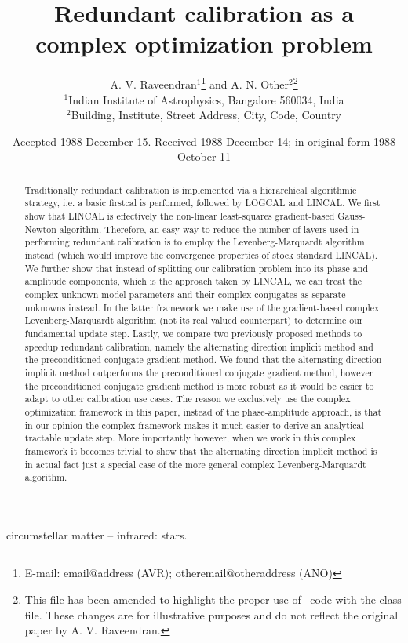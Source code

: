 \documentclass[useAMS,usenatbib]{mn2e}
\title[Unknown]{Redundant calibration as a complex optimization problem}
\author[A. V. Raveendran and A. N. Other]{A. V. Raveendran$^{1}$\thanks{E-mail:
email@address (AVR); otheremail@otheraddress (ANO)} and A. N.
Other$^{2}$\footnotemark[1]\thanks{This file has been amended to
highlight the proper use of \LaTeXe\ code with the class file.
These changes are for illustrative purposes and do not reflect the
original paper by A. V. Raveendran.}\\
$^{1}$Indian Institute of Astrophysics, Bangalore 560034, India\\
$^{2}$Building, Institute, Street Address, City, Code, Country}
\begin{document}
\date{Accepted 1988 December 15. Received 1988 December 14; in original form 1988 October 11}

\pagerange{\pageref{firstpage}--\pageref{lastpage}} 

\maketitle

\label{firstpage}

\begin{abstract}
Traditionally redundant calibration is implemented via a hierarchical algorithmic strategy, i.e. a basic firstcal is performed, followed by LOGCAL and LINCAL.  We first show
that LINCAL is effectively the non-linear least-squares gradient-based Gauss-Newton algorithm. Therefore, an easy way to reduce the number of layers used in performing redundant calibration is to employ the Levenberg-Marquardt algorithm instead (which would improve the convergence properties of stock standard LINCAL). 
We further show that instead of splitting our calibration problem into its phase and amplitude components,
which is the approach taken by LINCAL, we can treat the complex unknown model parameters and their complex conjugates as separate unknowns instead. In the latter framework
we make use of the gradient-based complex Levenberg-Marquardt algorithm (not its real valued counterpart) to determine our fundamental update step. 
Lastly, we compare two previously proposed methods to speedup redundant 
calibration, namely the alternating direction implicit method and the preconditioned conjugate gradient method. We found that the alternating 
direction implicit method outperforms the preconditioned conjugate gradient method, however the preconditioned conjugate gradient method is more robust as it would be easier to adapt to other calibration use cases. 
The reason we exclusively use the complex optimization framework in this paper, instead of the phase-amplitude approach, is that in our opinion the complex framework makes it much easier to derive an analytical tractable update step. More importantly however, when we work in this complex framework it becomes trivial to show that the alternating direction implicit method is in actual fact just a 
special case of the more general complex Levenberg-Marquardt algorithm.
\end{abstract}

\begin{keywords}
circumstellar matter -- infrared: stars.
\end{keywords}
\end{document}
